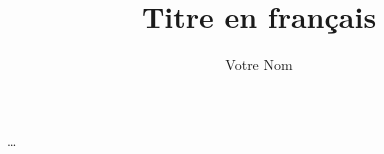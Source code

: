 ﻿\documentclass[memoire]{UqamLab}
\title{Titre en français}
\author{Votre Nom}
\begin{document}


\tableofcontents
\listoftables
\listoffigures

\begin{resume}
\end{resume}

\begin{abstract}
\end{abstract}



…


\appendix



\end{document}
